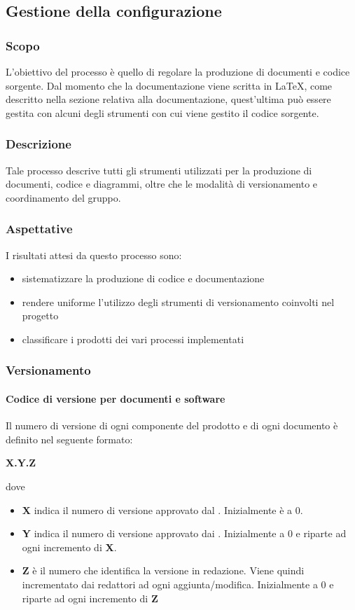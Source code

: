 \subsection{Gestione della configurazione}
\subsubsection{Scopo}
L'obiettivo del processo è quello di regolare la produzione di documenti e codice sorgente.
Dal momento che la documentazione viene scritta in \LaTeX, come descritto nella sezione relativa
alla documentazione, quest'ultima può essere gestita con alcuni degli strumenti con
cui viene gestito il codice sorgente.

\subsubsection{Descrizione}
Tale processo descrive tutti gli strumenti utilizzati per la produzione di documenti, codice e diagrammi,
oltre che le modalità di versionamento e coordinamento del gruppo.

\subsubsection{Aspettative}
I risultati attesi da questo processo sono:
\begin{itemize}
    \item sistematizzare la produzione di codice e documentazione
    \item rendere uniforme l'utilizzo degli strumenti di versionamento coinvolti nel progetto
    \item classificare i prodotti dei vari processi implementati
\end{itemize}

\subsubsection{Versionamento}
\paragraph{Codice di versione per documenti e software}
Il numero di versione di ogni componente del prodotto e di ogni documento è definito nel seguente formato:
\begin{center}
    \textbf{X.Y.Z}
\end{center}
dove
\begin{itemize}
    \item \textbf{X} indica il numero di versione approvato dal . Inizialmente è a 0.
    \item \textbf{Y} indica il numero di versione approvato dai . Inizialmente a 0 e riparte ad ogni
                       incremento di \textbf{X}.
    \item \textbf{Z} è il numero che identifica la versione in redazione. Viene quindi incrementato dai redattori
                       ad ogni aggiunta/modifica. Inizialmente a 0 e riparte ad ogni incremento di \textbf{Z}
\end{itemize}


